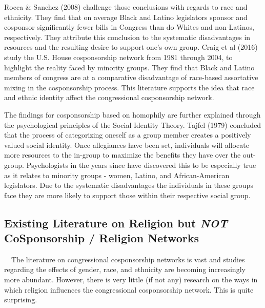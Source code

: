 \documentclass[Royal,times,sageh]{sagej}
\begin{document}
Rocca \& Sanchez (2008) challenge those conclusions with regards to race and ethnicity. They find that on average Black and Latino legislators sponsor and cosponsor significantly fewer bills in Congress than do Whites and non-Latinos, respectively. They attribute this conclusion to the systematic disadvantages in resources and the resulting desire to support one's own group. Craig et al (2016) study the U.S. House cosponsorship network from 1981 through 2004, to highlight the reality faced by minority groups. They find that Black and Latino members of congress are at a comparative disadvantage of race-based assortative mixing in the cosponsorship process. This literature supports the idea that race and ethnic identity affect the congressional cosponsorship network.

The findings for cosponsorship based on homophily are further explained through the psychological principles of the Social Identity Theory. Tajfel (1979) concluded that the process of categorizing oneself as a group member creates a positively valued social identity. Once allegiances have been set, individuals will allocate more resources to the in-group to maximize the benefits they have over the out-group. Psychologists in the years since have discovered this to be especially true as it relates to minority groups - women, Latino, and African-American legislators. Due to the systematic disadvantages the individuals in these groups face they are more likely to support those within their respective social group.

\hypertarget{existing-literature-on-religion-but-not-cosponsorship-religion-networks}{%
\subsection{\texorpdfstring{Existing Literature on Religion but \emph{NOT} CoSponsorship / Religion Networks}{Existing Literature on Religion but NOT CoSponsorship / Religion Networks}}\label{existing-literature-on-religion-but-not-cosponsorship-religion-networks}}

~~The literature on congressional cosponsorship networks is vast and studies regarding the effects of gender, race, and ethnicity are becoming increasingly more abundant. However, there is very little (if not any) research on the ways in which religion influences the congressional cosponsorship network. This is quite surprising.
\end{document}
